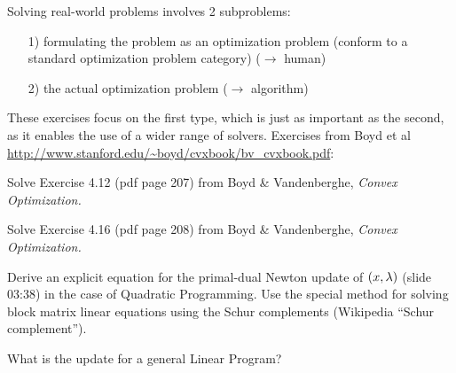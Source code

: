 

\renewcommand{\course}{Optimization}
\renewcommand{\coursepicture}{optim}
\renewcommand{\coursedate}{Summer 2015}
\renewcommand{\exnum}{7}

\exercises
{}
\exercisestitle


Solving real-world problems involves 2 subproblems:
\begin{enumerate}
\item[1)] formulating the problem as an optimization problem (conform to a
standard optimization problem category) ($\to$ human)
\item[2)] the actual optimization problem ($\to$ algorithm)
\end{enumerate}

These exercises focus on the first type, which is just as important as the
second, as it enables the use of a wider range of solvers.  Exercises from Boyd
et al \url{http://www.stanford.edu/~boyd/cvxbook/bv_cvxbook.pdf}:



Solve Exercise 4.12 (pdf page 207) from  Boyd \& Vandenberghe,
\emph{Convex Optimization.}



Solve Exercise 4.16 (pdf page 208) from  Boyd \& Vandenberghe,
\emph{Convex Optimization.}



Derive an explicit equation for the primal-dual Newton update of
$(x,\lambda)$ (slide 03:38) in the case of Quadratic Programming.  Use the
special method for solving block matrix linear equations using the
Schur complements (Wikipedia ``Schur complement'').

What is the update for a general Linear Program?

\exerfoot
